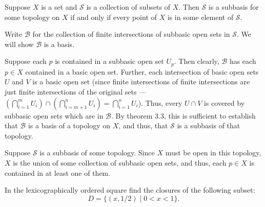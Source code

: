\documentclass[12 pt, letterpaper]{hmcpset}
\begin{document}
\begin{problem}[3.16.]
	Suppose $X$ is a set and $\mathcal{S}$ is a collection of subsets of $X$. Then $\mathcal{S}$ is a subbasis for some topology on $X$ if and only if every point of $X$ is in some element of $\mathcal{S}$.
\end{problem}

\begin{solution}
Write $\mathcal{B}$ for the collection of finite intersections of subbasic open sets in $\mathcal{S}$. We will show $\mathcal{B}$ is a basis.

Suppose each $p$ is contained in a subbasic open set $U_{p}$. Then clearly, $\mathcal{B}$ has each $p \in X$ contained in a basic open set. Further, each intersection of basic open sets $U$ and $V$ is a basic open set (since finite intersections of finite intersections are just finite intersections of the original sets — $\left( \bigcap_{i = 1}^m U_{i} \right) \cap \left(  \bigcap_{i = m + 1}^n U_{i} \right) = \bigcap_{i = 1}^n U_{i}$). Thus, every $U \cap V$ is covered by subbasic open sets which are in $\mathcal{B}$. By theorem 3.3, this is sufficient to establish that $\mathcal{B}$ is a basis of a topology on $X$, and thus, that $\mathcal{S}$ is a subbasis of that topology.

Suppose $\mathcal{S}$ is a subbasis of some topology. Since $X$ must be open in this topology, $X$ is the union of some collection of subbasic open sets, and thus, each $p \in X$ is contained in at least one of them.
\end{solution}

\pagebreak

\begin{problem}[3.21.]
	In the lexicographically ordered square find the closures of the following subset:
	\[
		D = \{ (x, 1 / 2) \mid 0 < x < 1 \}.
	\]
\end{problem}
\end{document}
